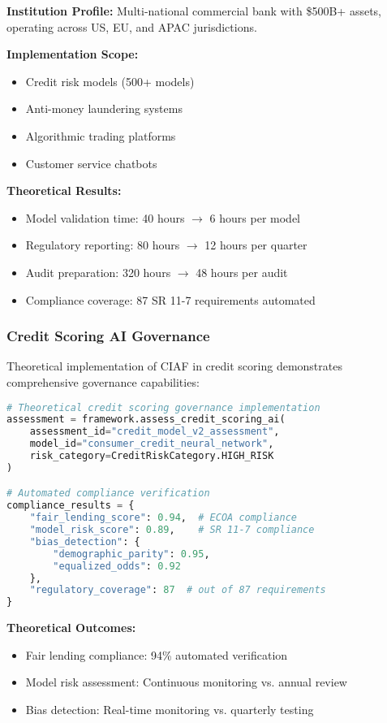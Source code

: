 \documentclass[12pt,a4paper]{article}
\begin{document}
\textbf{Institution Profile:} Multi-national commercial bank with \$500B+ assets, operating across US, EU, and APAC jurisdictions.

\textbf{Implementation Scope:}
\begin{itemize}
\item Credit risk models (500+ models)
\item Anti-money laundering systems
\item Algorithmic trading platforms
\item Customer service chatbots
\end{itemize}

\textbf{Theoretical Results:}
\begin{itemize}
\item Model validation time: 40 hours $\rightarrow$ 6 hours per model
\item Regulatory reporting: 80 hours $\rightarrow$ 12 hours per quarter
\item Audit preparation: 320 hours $\rightarrow$ 48 hours per audit
\item Compliance coverage: 87 SR 11-7 requirements automated
\end{itemize}

\subsubsection{Credit Scoring AI Governance}

Theoretical implementation of CIAF in credit scoring demonstrates comprehensive governance capabilities:

\begin{lstlisting}[language=Python, caption=Credit Scoring Governance Implementation]
# Theoretical credit scoring governance implementation
assessment = framework.assess_credit_scoring_ai(
    assessment_id="credit_model_v2_assessment",
    model_id="consumer_credit_neural_network",
    risk_category=CreditRiskCategory.HIGH_RISK
)

# Automated compliance verification
compliance_results = {
    "fair_lending_score": 0.94,  # ECOA compliance
    "model_risk_score": 0.89,    # SR 11-7 compliance
    "bias_detection": {
        "demographic_parity": 0.95,
        "equalized_odds": 0.92
    },
    "regulatory_coverage": 87  # out of 87 requirements
}
\end{lstlisting}

\textbf{Theoretical Outcomes:}
\begin{itemize}
\item Fair lending compliance: 94\% automated verification
\item Model risk assessment: Continuous monitoring vs. annual review
\item Bias detection: Real-time monitoring vs. quarterly testing
\end{itemize}
\end{document}
